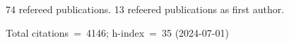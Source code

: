 74 refereed publications. 13 refeered publications as first author.

Total citations~=~4146; h-index~=~35 (2024-07-01)